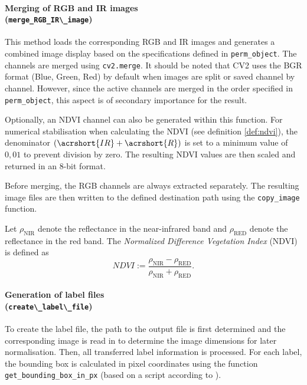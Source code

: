 \paragraph{Merging of RGB and IR images \\ (\lstinline|merge_RGB_IR\_image|)}
\hypertarget{par:merge_RGB_IR}{}
This method loads the corresponding \acrshort{RGB} and \acrshort{IR} images and generates a combined image display based on the specifications defined in \lstinline|perm_object|. The channels are merged using \lstinline|cv2.merge|. It should be noted that \acrshort{CV2} uses the BGR format (Blue, Green, Red) by default when images are split or saved channel by channel. However, since the active channels are merged in the order specified in \lstinline|perm_object|, this aspect is of secondary importance for the result.

Optionally, an \acrshort{NDVI} channel can also be generated within this function. For numerical stabilisation when calculating the \acrshort{NDVI} (see definition \ref{def:ndvi}), the denominator $(\acrshort{IR} + \acrshort{R})$ is set to a minimum value of $0{,}01$ to prevent division by zero. The resulting \acrshort{NDVI} values are then scaled and returned in an 8-bit format.

Before merging, the \acrshort{RGB} channels are always extracted separately. The resulting image files are then written to the defined destination path using the \lstinline|copy_image| function.



\begin{definition}
Let $\rho_{\text{NIR}}$ denote the reflectance in the near-infrared band and 
$\rho_{\text{RED}}$ denote the reflectance in the red band. 
The \textit{Normalized Difference Vegetation Index} (NDVI) is defined as
\begin{equation}
NDVI := \frac{\rho_{\text{NIR}} - \rho_{\text{RED}}}{\rho_{\text{NIR}} + \rho_{\text{RED}}}.
\end{equation}
\label{def:ndvi}
\end{definition}



\paragraph{Generation of label files \\ (\lstinline|create\_label\_file|)}
\hypertarget{par:create_label_file}{}

To create the label file, the path to the output file is first determined and the corresponding image is read in to determine the image dimensions for later normalisation. Then, all transferred label information is processed. For each label, the bounding box is calculated in pixel coordinates using the function \lstinline|get_bounding_box_in_px| (based on a script according to \citeauthor{Razakarivony2015} \cite{Razakarivony2015}).

